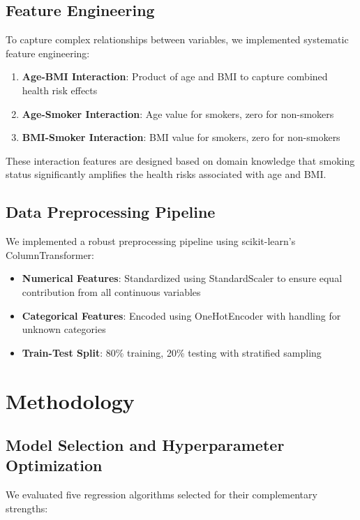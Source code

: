 \documentclass[times, twoside, watermark]{zHenriquesLab-StyleBioRxiv}
\begin{document}
\subsection*{Feature Engineering}

To capture complex relationships between variables, we implemented systematic feature engineering:

\begin{enumerate}
\item \textbf{Age-BMI Interaction}: Product of age and BMI to capture combined health risk effects
\item \textbf{Age-Smoker Interaction}: Age value for smokers, zero for non-smokers
\item \textbf{BMI-Smoker Interaction}: BMI value for smokers, zero for non-smokers
\end{enumerate}

These interaction features are designed based on domain knowledge that smoking status significantly amplifies the health risks associated with age and BMI.

\subsection*{Data Preprocessing Pipeline}

We implemented a robust preprocessing pipeline using scikit-learn's ColumnTransformer:

\begin{itemize}
\item \textbf{Numerical Features}: Standardized using StandardScaler to ensure equal contribution from all continuous variables
\item \textbf{Categorical Features}: Encoded using OneHotEncoder with handling for unknown categories
\item \textbf{Train-Test Split}: 80\% training, 20\% testing with stratified sampling
\end{itemize}

\section*{Methodology}

\subsection*{Model Selection and Hyperparameter Optimization}

We evaluated five regression algorithms selected for their complementary strengths:
\end{document}

